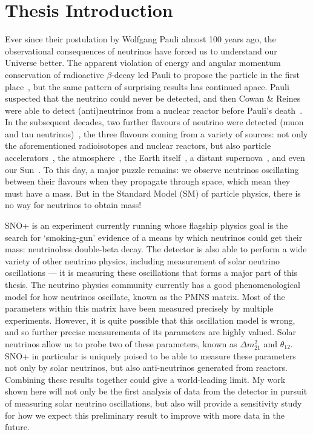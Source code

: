 \section{Thesis Introduction}\label{sect:Introduction}

Ever since their postulation by Wolfgang Pauli almost 100 years ago, the observational consequences of neutrinos have forced us to understand our Universe better. The apparent violation of energy and angular momentum conservation of radioactive $\beta$-decay led Pauli to propose the particle in the first place~\cite{noauthor_rapports_1935}, but the same pattern of surprising results has continued apace. Pauli suspected that the neutrino could never be detected, and then Cowan \& Reines were able to detect (anti)neutrinos from a nuclear reactor before Pauli's death~\cite{}. In the subsequent decades, two further flavours of neutrino were detected (muon and tau neutrinos)~\cite{}, the three flavours coming from a variety of sources: not only the aforementioned radioisotopes and nuclear reactors, but also particle accelerators~\cite{}, the atmosphere~\cite{}, the Earth itself~\cite{}, a distant supernova~\cite{}, and even our Sun~\cite{}. To this day, a major puzzle remains: we observe neutrinos oscillating between their flavours when they propagate through space, which mean they must have a mass. But in the Standard Model (SM) of particle physics, there is no way for neutrinos to obtain mass!

SNO+ is an experiment currently running whose flagship physics goal is the search for `smoking-gun' evidence of a means by which neutrinos could get their mass: neutrinoless double-beta decay. The detector is also able to perform a wide variety of other neutrino physics, including measurement of solar neutrino oscillations --- it is measuring these oscillations that forms a major part of this thesis. The neutrino physics community currently has a good phenomenological model for how neutrinos oscillate, known as the PMNS matrix. Most of the parameters within this matrix have been measured precisely by multiple experiments. However, it is quite possible that this oscillation model is wrong, and so further precise measurements of its parameters are highly valued. Solar neutrinos allow us to probe two of these parameters, known as $\Delta m^{2}_{21}$ and $\theta_{12}$. SNO+ in particular is uniquely poised to be able to measure these parameters not only by solar neutrinos, but also anti-neutrinos generated from reactors. Combining these results together could give a world-leading limit. My work shown here will not only be the first analysis of data from the detector in pursuit of measuring solar neutrino oscillations, but also will provide a sensitivity study for how we expect this preliminary result to improve with more data in the future.


